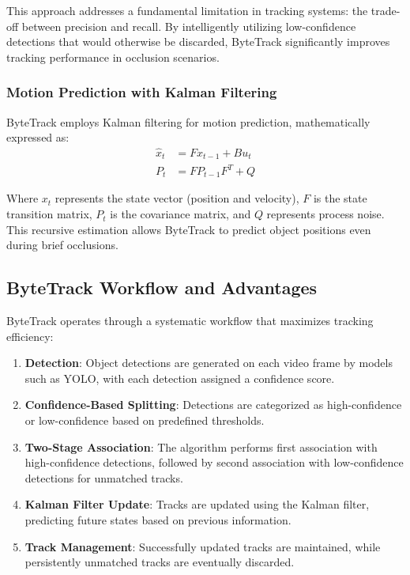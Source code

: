 \documentclass[11pt]{article}
\begin{document}
This approach addresses a fundamental limitation in tracking systems: the trade-off between precision and recall. By intelligently utilizing low-confidence detections that would otherwise be discarded, ByteTrack significantly improves tracking performance in occlusion scenarios.

\subsubsection{Motion Prediction with Kalman Filtering}
ByteTrack employs Kalman filtering for motion prediction, mathematically expressed as:
\begin{align}
\hat{x}_t &= Fx_{t-1} + Bu_t \\
P_t &= FP_{t-1}F^T + Q
\end{align}

Where $x_t$ represents the state vector (position and velocity), $F$ is the state transition matrix, $P_t$ is the covariance matrix, and $Q$ represents process noise. This recursive estimation allows ByteTrack to predict object positions even during brief occlusions.

\subsection{ByteTrack Workflow and Advantages}

ByteTrack operates through a systematic workflow that maximizes tracking efficiency:

\begin{enumerate}
    \item \textbf{Detection}: Object detections are generated on each video frame by models such as YOLO, with each detection assigned a confidence score.
    
    \item \textbf{Confidence-Based Splitting}: Detections are categorized as high-confidence or low-confidence based on predefined thresholds.
    
    \item \textbf{Two-Stage Association}: The algorithm performs first association with high-confidence detections, followed by second association with low-confidence detections for unmatched tracks.
    
    \item \textbf{Kalman Filter Update}: Tracks are updated using the Kalman filter, predicting future states based on previous information.
    
    \item \textbf{Track Management}: Successfully updated tracks are maintained, while persistently unmatched tracks are eventually discarded.
\end{enumerate}
\end{document}
